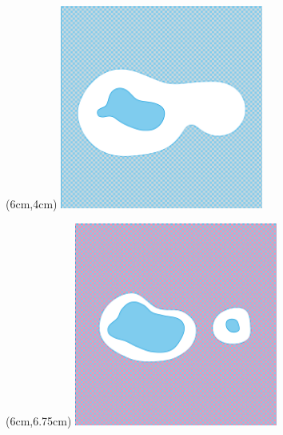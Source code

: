 \begin{frame}
  \begin{textblock*}{6cm}(6cm,4cm)
    \centering
    \includegraphics[trim=50 250 50 300, clip, width=0.5\textwidth]{figures/ass1_2/DB1comp}%
  \end{textblock*}
  \begin{textblock*}{6cm}(6cm,6.75cm)
    \centering
    \includegraphics[trim=50 250 50 300, clip, width=0.5\textwidth]{figures/ass1_2cover/PQ1comp}%
  \end{textblock*}

\end{frame}

